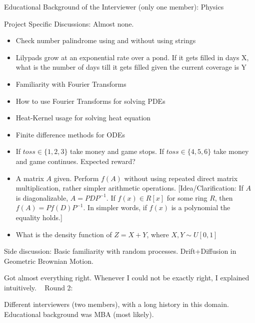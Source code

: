 \documentclass[12pt]{article}
\begin{document}
Educational Background of the Interviewer (only one member): Physics

Project Specific Discussions: Almost none.

\begin{itemize}
    \item Check number palindrome using and without using strings
    \item Lilypads grow at an exponential rate over a pond. If it gets filled in days X, what is the number of days till it gets filled given the current coverage is Y
    \item Familiarity with Fourier Transforms
    \item How to use Fourier Transforms for solving PDEs
    \item Heat-Kernel usage for solving heat equation
    \item Finite difference methods for ODEs
    \item If $toss \in \{1,2,3\}$ take money and game stops. If $toss \in \{4,5,6\}$ take money and game continues. Expected reward?
    \item A matrix $A$ given. Perform $f(A)$ without using repeated direct matrix multiplication, rather simpler arithmetic operations. [Idea/Clarification: If $A$ is diagonalizable, $A=PDP^{-1}$. If $f(x) \in R[x]$ for some ring $R$, then $f(A)=Pf(D)P^{-1}$. In simpler words, if $f(x)$ is a polynomial the equality holds.]
    \item What is the density function of $Z=X+Y$, where $X, Y \sim U[0,1]$ 
\end{itemize}

Side discussion: Basic familiarity with random processes. Drift+Diffusion in Geometric Brownian Motion.

Got almost everything right. Whenever I could not be exactly right, I explained intuitively.
\vspace{15pt}\
\newline
Round 2:

Different interviewers (two members), with a long history in this domain. Educational background was MBA (most likely).
\end{document}
